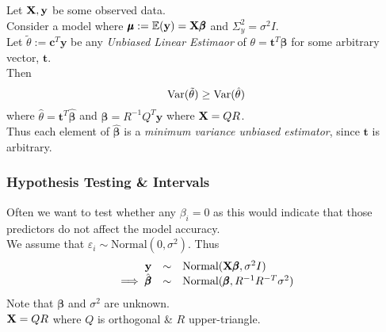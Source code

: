 \documentclass[11pt,a4paper]{article}
\begin{document}
Let $\textbf{X},\textbf{y}$ be some observed data.\\
Consider a model where $\pmb\mu:=\mathbb{E}(\textbf{y})=\textbf{X}\pmb\beta$ and $\Sigma^2_y=\sigma^2I$.\\
Let $\tilde\theta:=\textbf{c}^T\textbf{y}$ be any \textit{Unbiased Linear Estimaor} of $\theta=\textbf{t}^T\pmb\beta$ for some arbitrary vector, $\textbf{t}$.\\
Then
$$\mathrm{Var}(\tilde\theta)\geq\mathrm{Var}(\hat\theta)$$
where $\hat\theta=\textbf{t}^T\hat{\pmb\beta}$ and $\hat{\pmb\beta}=R^{-1}Q^T\textbf{y}$ where $\textbf{X}=QR$.\\
Thus each element of $\hat{\pmb\beta}$ is a \textit{minimum variance unbiased estimator}, since $\textbf{t}$ is arbitrary.

\subsubsection{Hypothesis Testing \& Intervals}

Often we want to test whether any $\beta_i=0$ as this would indicate that those predictors do not affect the model accuracy.\\

We assume that $\varepsilon_i\sim\text{Normal}(0,\sigma^2)$. Thus
\[\begin{array}{rcl}
\textbf{y}&\sim&\text{Normal}(\textbf{X}\pmb\beta,\sigma^2I)\\
\implies\hat{\pmb\beta}&\sim&\text{Normal}(\pmb\beta,R^{-1}R^{-T}\sigma^2)
\end{array}\]
Note that $\pmb\beta$ and $\sigma^2$ are unknown.\\
\nb $\textbf{X}=QR$ where $Q$ is orthogonal \& $R$ upper-triangle.
\end{document}

